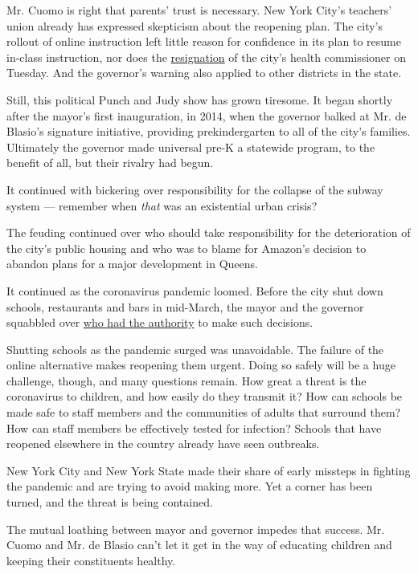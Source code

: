 Mr. Cuomo is right that parents' trust is necessary. New York City's
teachers' union already has expressed skepticism about the reopening
plan. The city's rollout of online instruction left little reason for
confidence in its plan to resume in-class instruction, nor does the
\href{https://www.nytimes3xbfgragh.onion/2020/08/04/nyregion/oxiris-barbot-health-commissioner-resigns.html?referringSource=articleShare}{resignation}
of the city's health commissioner on Tuesday. And the governor's warning
also applied to other districts in the state.

Still, this political Punch and Judy show has grown tiresome. It began
shortly after the mayor's first inauguration, in 2014, when the governor
balked at Mr. de Blasio's signature initiative, providing
prekindergarten to all of the city's families. Ultimately the governor
made universal pre-K a statewide program, to the benefit of all, but
their rivalry had begun.

It continued with bickering over responsibility for the collapse of the
subway system --- remember when \emph{that} was an existential urban
crisis?

The feuding continued over who should take responsibility for the
deterioration of the city's public housing and who was to blame for
Amazon's decision to abandon plans for a major development in Queens.

It continued as the coronavirus pandemic loomed. Before the city shut
down schools, restaurants and bars in mid-March, the mayor and the
governor squabbled over
\href{https://www.nytimes3xbfgragh.onion/2020/03/17/nyregion/coronavirus-nyc-shelter-in-place.html}{who
had the authority} to make such decisions.

Shutting schools as the pandemic surged was unavoidable. The failure of
the online alternative makes reopening them urgent. Doing so safely will
be a huge challenge, though, and many questions remain. How great a
threat is the coronavirus to children, and how easily do they transmit
it? How can schools be made safe to staff members and the communities of
adults that surround them? How can staff members be effectively tested
for infection? Schools that have reopened elsewhere in the country
already have seen outbreaks.

New York City and New York State made their share of early missteps in
fighting the pandemic and are trying to avoid making more. Yet a corner
has been turned, and the threat is being contained.

The mutual loathing between mayor and governor impedes that success. Mr.
Cuomo and Mr. de Blasio can't let it get in the way of educating
children and keeping their constituents healthy.

